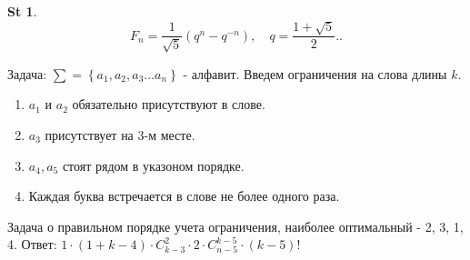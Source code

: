 \documentclass[a5paper, 10pt]{article}
\theoremstyle{plain}
\newtheorem*{statement}{St}
\begin{document}
    \begin{statement}
        \[
            F_n = \frac{1}{\sqrt 5}(q^n - q^{-n}), \quad q = \frac{1 + \sqrt 5}{2}.
        .\]
    \end{statement}

    Задача: $ \sum = \left\{ a_1, a_2, a_3 \dots a_n \right\} $ - алфавит.
    Введем ограничения на слова длины $ k $.

    \begin{enumerate}
        \item $ a_1 $ и $ a_2 $ обязательно присутствуют в слове.
        \item $ a_3 $ присутствует на 3-м месте.
        \item $ a_4, a_5 $ стоят рядом в указоном порядке.
        \item Каждая буква встречается в слове не более одного раза.
    \end{enumerate}

    Задача о правильном порядке учета ограничения, наиболее оптимальный - 2, 3, 1, 4. \newline
    Ответ:
    $ 1 \cdot (1 + k - 4) \cdot C_{k-3}^2 \cdot 2 \cdot C_{n-5}^{k-5} \cdot (k - 5)! $
\end{document}
